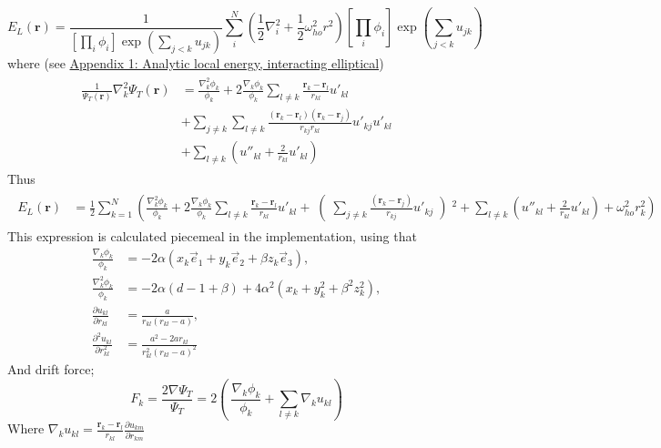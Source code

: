 \documentclass[%
oneside,                 %
final,                   %
10pt]{article}
\begin{document}
\begin{equation}
    E_L(\mathbf{r}) =\frac{1}{ 
    \left[
    \prod_i \phi_i
\right]
\exp{\left(\sum_{j<k}u_{jk}\right)}
}  \sum_i^N \left(\frac{1}{2}{\nabla }_{i}^2 +\frac{1}{2}\omega_{ho}^2r^2 \right)  \left[
    \prod_i \phi_i
\right]
\exp{\left(\sum_{j<k}u_{jk}\right)}
\end{equation}
where (see \hyperref[APP_1:le_2]{Appendix 1: Analytic local energy, interacting elliptical})
\begin{align}
\begin{split}
\frac{1}{\Psi_T(\mathbf{r})} \nabla_k^2\Psi_T(\mathbf{r}) 
&=
\frac{\nabla_k^2 \phi_k}{\phi_k} + 2  \frac{\nabla_k \phi_k}{\phi_k} \sum_{l\ne k}\frac{\bm r_k - \bm r_l}{r_{kl}}  u'_{kl}  \\
&+  \sum_{j\ne k} \sum_{l\ne k} \frac{(\bm r_k - \bm r_l)(\bm r_k - \bm r_j)}{r_{kj} r_{kl} }  u'_{kj}  u'_{kl} \\
&+ \sum_{l\ne k} \left(   u{''}_{kl} + \frac{2}{r_{kl}}   u'_{kl} \right)
\end{split}
\end{align}
Thus
\begin{align}
\begin{split}
    E_L(\mathbf{r}) &= \frac{1}{2}\sum_{k=1}^N \left(\frac{\nabla_k^2 \phi_k}{\phi_k} 
    + 2 \frac{\nabla_k \phi_k}{\phi_k} \sum_{l\ne k}\frac{\bm r_k - \bm r_l}{r_{kl}}  u'_{kl}
    +  \right( \sum_{j\ne k}  \frac{(\bm r_k - \bm r_j)}{r_{kj} }  u'_{kj} \left)^2
    +  \sum_{l\ne k} \left(   u{''}_{kl} + \frac{2}{r_{kl}}   u'_{kl} \right) +\omega_{ho}^2r_k^2 \right)  
\end{split}
\end{align}
This expression is calculated piecemeal in the implementation, using that
\begin{align*}
\frac{\nabla_k \phi_k}{\phi_k} &=-2\alpha (x_k \vec e_1 + y_k \vec e_2 + \beta z_k \vec e_3), \\
\frac{\nabla_k^2 \phi_k}{\phi_k}&=-2\alpha (d-1+\beta)+4\alpha^2 (x_k   + y_k^2 + \beta^2 z_k^2), \\
\frac{\partial u_{kl}}{\partial r_{kl}}&= \frac{a}{r_{kl}(r_{kl}-a)}, \\
\frac{\partial^2 u_{kl}}{\partial r^2_{kl}}&= \frac{a^2-2ar_{kl}}{r_{kl}^2(r_{kl}-a)^2}
\end{align*}
And drift force;
\begin{equation*}
F_k = \frac{2\nabla \Psi_T}{\Psi_T}= 2 \left(\ \frac{\nabla_k \phi_k}{\phi_k} + \sum_{l\ne k}\nabla_k u_{kl} \right) 
\end{equation*}
Where $\nabla_k u_{kl}=\frac{\bm r_k - \bm r_l}{r_{kl}}\frac{\partial u_{km}}{\partial r_{km}}$
\end{document}
